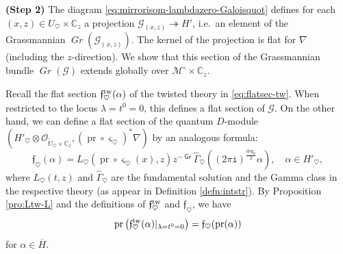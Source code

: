 \documentclass[11pt]{amsart}
\theoremstyle{definition} %
\theoremstyle{remark} %
\newcommand{\CC}{\mathbb C}
\newcommand{\tw}{{\rm tw}}
\newcommand{\cO}{\mathcal{O}}
\newcommand{\cMo}{\mathcal{M}^\circ}
\newcommand{\cG}{\mathcal{G}}
\newcommand{\frf}{\mathfrak{f}}
\newcommand{\grading}{\operatorname{\mathsf{Gr}}} %
\newcommand{\Grass}{\operatorname{\mathit{Gr}}} %
\newcommand{\pr}{\operatorname{pr}}
\newcommand{\hGamma}{\widehat{\Gamma}}
\newcommand{\tU}{\widetilde{U}}
\newcommand{\ov}{\overline}
\newcommand{\iu}{\mathtt{i}}
\begin{document}
\vspace{5pt} 
\noindent 
{\bf (Step 2)} 
The diagram \eqref{eq:mirrorisom-lambdazero-Galoisquot}  
defines for each $(x,z)\in U_\heartsuit\times \CC_z$ 
a projection $\cG_{(x,z)} \twoheadrightarrow H'$, i.e.\ 
an element of the Grassmannian $\Grass(\cG_{(x,z)})$. 
The kernel of the projection is flat for $\nabla$  
(including the $z$-direction). 
We show that this section of the Grassmannian bundle 
$\Grass(\cG)$ extends globally over $\cMo\times \CC_z$. 

Recall the flat section $\frf^\tw_\heartsuit(\alpha)$ 
of the twisted theory in \eqref{eq:flatsec-tw}. 
When restricted to the locus $\lambda=t^0=0$, 
this defines a flat section of $\cG$. 
On the other hand, we can define a flat 
section of the quantum $D$-module 
$(H'_\heartsuit \otimes 
\cO_{\tU_\heartsuit \times \CC_z}, 
(\pr \circ \varsigma_\heartsuit)^* \nabla)$ 
by an analogous formula: 
\begin{equation} 
\label{eq:f-section} 
\frf_\heartsuit(\alpha) = 
L_\heartsuit(\pr \circ \varsigma_\heartsuit(x),z) z^{-\grading} 
\hGamma_\heartsuit 
\left( 
(2\pi\iu)^{\frac{\deg_0}{2}} \alpha\right), 
\quad \alpha \in H'_\heartsuit,  
\end{equation} 
where $L_\heartsuit(t,z)$ and $\hGamma_\heartsuit$ 
are the fundamental solution 
and the Gamma class in the respective theory 
(as appear in Definition \ref{defn:intstr}). 
By Proposition \ref{pro:Ltw-L} and the definitions of 
$\frf^\tw_\heartsuit$ and $\frf_\heartsuit$, we have 
\begin{equation} 
\label{eq:iota-frf} 
\pr\left( \frf^\tw_\heartsuit(\alpha)|_{\lambda=t^0=0} \right) 
= \frf_\heartsuit(\pr(\alpha)) 
\end{equation} 
for $\alpha \in \ov{H}$. 
\end{document}
